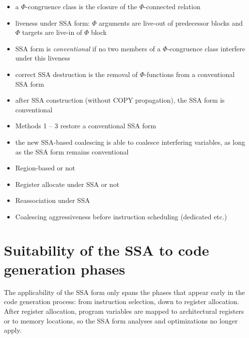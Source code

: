 \begin{itemize}

\item a $\Phi$-congruence class is the closure of the $\Phi$-connected relation

\item liveness under SSA form: $\Phi$ arguments are live-out of predecessor
blocks and $\Phi$ targets are live-in of $\Phi$ block

\item SSA form is \emph{conventional} if no two members of a $\Phi$-congruence
class interfere under this liveness

\item correct SSA destruction is the removal of $\Phi$-functions from
a conventional SSA form

\item after SSA construction (without COPY propagation), the SSA form is
conventional

\item Methods 1 -- 3 restore a conventional SSA form

\item the new SSA-based coalescing is able to coalesce interfering variables, as long
as the SSA form remains conventional

\end{itemize}


\begin{itemize}

\item Region-based or not

\item Register allocate under SSA or not

\item Reassociation under SSA

\item Coalescing aggressiveness before instruction scheduling (dedicated etc.)

\end{itemize}


\section{Suitability of the SSA to code generation phases}
\label{sec:ssa-codegen-suitability}

The applicability of the SSA form only spans the phases that appear
early in the code generation process: from instruction selection, down to
register allocation. After register allocation, program variables are mapped to
architectural registers or to memory locations, so the SSA form analyses and
optimizations no longer apply.

